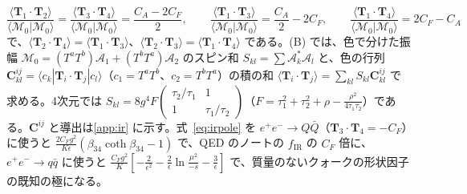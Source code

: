 \documentclass[a4paper,10pt]{ltjsarticle}
\begin{document}
\begin{equation}
\frac{\langle\boldsymbol T_1\!\cdot\!\boldsymbol T_2\rangle}{\langle\mathcal M_0|\mathcal M_0\rangle}=\frac{\langle\boldsymbol T_3\!\cdot\!\boldsymbol T_4\rangle}{\langle\mathcal M_0|\mathcal M_0\rangle}=\frac{C_A-2C_F}{2},\qquad
\frac{\langle\boldsymbol T_1\!\cdot\!\boldsymbol T_3\rangle}{\langle\mathcal M_0|\mathcal M_0\rangle}=\frac{C_A}{2}-2C_F,\qquad
\frac{\langle\boldsymbol T_1\!\cdot\!\boldsymbol T_4\rangle}{\langle\mathcal M_0|\mathcal M_0\rangle}=2C_F-C_A
\label{eq:colcorr}
\end{equation}
で、$\langle\boldsymbol T_2\!\cdot\!\boldsymbol T_4\rangle=\langle\boldsymbol T_1\!\cdot\!\boldsymbol T_3\rangle$、$\langle\boldsymbol T_2\!\cdot\!\boldsymbol T_3\rangle=\langle\boldsymbol T_1\!\cdot\!\boldsymbol T_4\rangle$ である。(B) では、色で分けた振幅 $\mathcal M_0=(T^aT^b)\mathcal A_1+(T^bT^a)\mathcal A_2$ のスピン和 $S_{kl}=\sum\mathcal A_k^*\mathcal A_l$ と、色の行列 $\boldsymbol C^{ij}_{kl}=\langle c_k|\boldsymbol T_i\!\cdot\!\boldsymbol T_j|c_l\rangle$（$c_1=T^aT^b$、$c_2=T^bT^a$）の積の和 $\langle\boldsymbol T_i\!\cdot\!\boldsymbol T_j\rangle=\sum_{kl}S_{kl}\boldsymbol C^{ij}_{kl}$ で求める。4次元では $S_{kl}=8g^4F\begin{pmatrix}\tau_2/\tau_1&1\\1&\tau_1/\tau_2\end{pmatrix}$（$F=\tau_1^2+\tau_2^2+\rho-\frac{\rho^2}{4\tau_1\tau_2}$）である。$\boldsymbol C^{ij}$ と導出は\ref{app:ir} に示す。式~\eqref{eq:irpole} を $e^+e^-\to Q\bar Q$（$\boldsymbol T_3\!\cdot\!\boldsymbol T_4=-C_F$）に使うと $\frac{2C_Fg^2}{K\epsilon}(\beta_{34}\coth\beta_{34}-1)$ で、QED のノートの $f_{\mathrm{IR}}$ の $C_F$ 倍に、$e^+e^-\to q\bar q$ に使うと $\frac{C_Fg^2}{K}[-\frac2{\epsilon^2}-\frac2\epsilon\ln\frac{\mu^2}{-s}-\frac3\epsilon]$ で、質量のないクォークの形状因子の既知の極になる。
\end{document}
